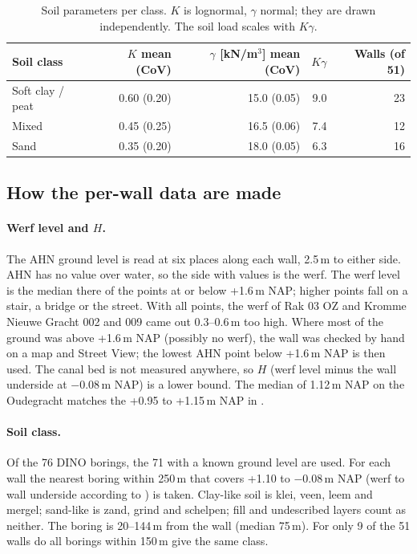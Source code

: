 \begin{table}[htbp]
\centering
\small
\caption{Soil parameters per class. $K$ is lognormal, $\gamma$ normal; they
are drawn independently. The soil load scales with $K\gamma$.}
\label{tab:soil}
\begin{tabular}{@{}l r r r r@{}}
\toprule
Soil class & $K$ mean (CoV) & $\gamma$ [kN/m$^3$] mean (CoV) & $K\gamma$ & Walls (of 51) \\
\midrule
Soft clay / peat & 0.60 (0.20) & 15.0 (0.05) & 9.0 & 23 \\
Mixed            & 0.45 (0.25) & 16.5 (0.06) & 7.4 & 12 \\
Sand             & 0.35 (0.20) & 18.0 (0.05) & 6.3 & 16 \\
\bottomrule
\end{tabular}
\end{table}

\subsection{How the per-wall data are made}\label{app:data-method}

\paragraph{Werf level and $H$.} The AHN ground level is read at six places
along each wall, 2.5\,m to either side. AHN has no value over water, so the
side with values is the werf. The werf level is the median there of the points
at or below +1.6\,m NAP; higher points fall on a stair, a bridge or the street.
With all points, the werf of Rak 03 OZ and Kromme Nieuwe Gracht 002 and 009
came out 0.3--0.6\,m too high. Where most of the
ground was above +1.6\,m NAP (possibly no werf), the wall was checked by hand
on a map and Street View; the lowest AHN point below +1.6\,m NAP is then used.
The canal bed is not measured anywhere, so $H$ (werf level minus the wall
underside at $-0.08$\,m NAP) is a lower bound. The median of 1.12\,m NAP on
the Oudegracht matches the +0.95 to +1.15\,m NAP in
\textcite{erfgoed156,erfgoed158}.

\paragraph{Soil class.} Of the 76 DINO borings, the 71 with a known ground
level are used. For each wall the nearest boring within 250\,m that covers
+1.10 to $-0.08$\,m NAP (werf to wall underside according to \textcite{erfgoed158}) is taken.
Clay-like soil is klei, veen, leem and mergel; sand-like is zand, grind and
schelpen; fill and undescribed layers count as neither. The boring is
20--144\,m from the wall (median 75\,m). For only 9 of the 51 walls do all
borings within 150\,m give the same class.

